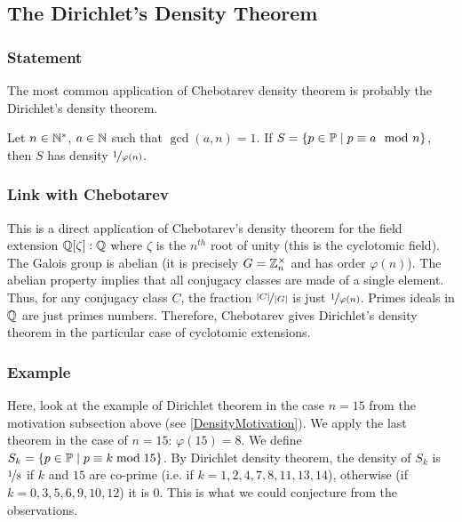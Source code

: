 \subsection{The Dirichlet's Density Theorem}
\subsubsection{Statement}
The most common application of Chebotarev density theorem is probably the Dirichlet's density theorem.
\begin{theorem}
	Let $n \in \mathbb{N}^*$, $a \in \mathbb{N}$ such that $\gcd(a,n) = 1$. 
	If $S = \{ p \in \mathbb{P} \mid p \equiv a \mod n \}$, then $S$ has density $\nicefrac{1}{\varphi(n)}$.
\end{theorem}

\subsubsection{Link with Chebotarev}
This is a direct application of Chebotarev's density theorem for the field extension $\mathbb{Q}[\zeta]:\mathbb{Q}$ where $\zeta$ is the $n^{th}$ root of unity (this is the cyclotomic field).
The Galois group is abelian (it is precisely $G=\mathbb{Z}_n^{\times}$ and has order $\varphi(n)$).
The abelian property implies that all conjugacy classes are made of a single element.
Thus, for any conjugacy class $C$, the fraction $\nicefrac{|C|}{|G|}$ is just $\nicefrac{1}{\varphi(n)}$.
Primes ideals in $\mathbb{Q}$ are just primes numbers.
Therefore, Chebotarev gives Dirichlet's density theorem in the particular case of cyclotomic extensions.

\subsubsection{Example}
Here, look at the example of Dirichlet theorem in the case $n=15$ from the motivation subsection above (see \ref{DensityMotivation}).
We apply the last theorem in the case of $n=15$: $\varphi(15)=8$.
We define $S_k = \{ p \in \mathbb{P} \mid p \equiv k \bmod 15 \}$.
By Dirichlet density theorem,  the density of $S_k$ is $\nicefrac{1}{8}$ if $k$ and $15$ are co-prime (i.e. if $k = 1,2,4,7,8,11,13,14$), otherwise (if $k=0,3,5,6,9,10,12$) it is $0$.
This is what we could conjecture from the observations.

